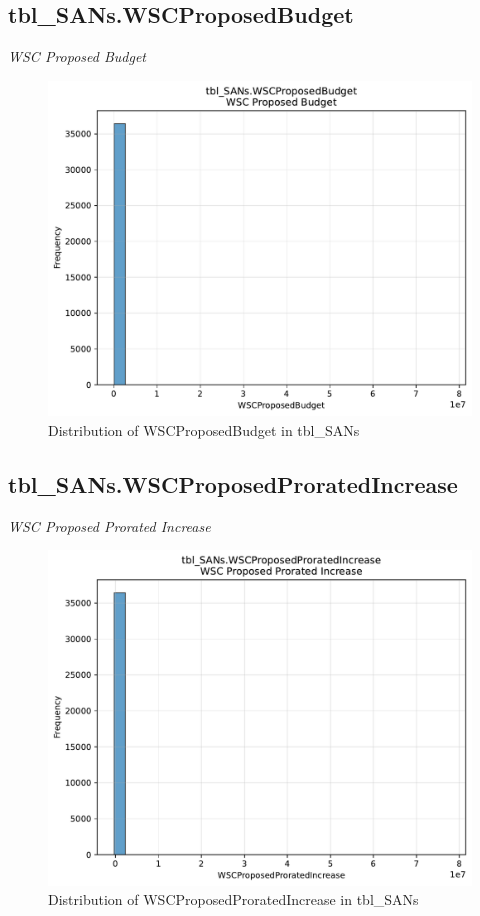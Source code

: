 \subsection{tbl\_SANs.WSCProposedBudget}
\textit{WSC Proposed Budget}

\begin{figure}[htbp]
\centering
\includegraphics[width=\textwidth]{figures/dbo_tbl_SANs_WSCProposedBudget.pdf}
\caption{Distribution of WSCProposedBudget in tbl\_SANs}
\end{figure}\newpage

\subsection{tbl\_SANs.WSCProposedProratedIncrease}
\textit{WSC Proposed Prorated Increase}

\begin{figure}[htbp]
\centering
\includegraphics[width=\textwidth]{figures/dbo_tbl_SANs_WSCProposedProratedIncrease.pdf}
\caption{Distribution of WSCProposedProratedIncrease in tbl\_SANs}
\end{figure}\newpage

